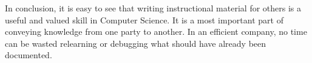 \documentclass{memoir}
\begin{document}
In conclusion, it is easy to see that writing instructional material for others is a useful and valued skill in Computer Science. It is a most important part of conveying knowledge from one party to another. In an efficient company, no time can be wasted relearning or debugging what should have already been documented.
\end{document}
